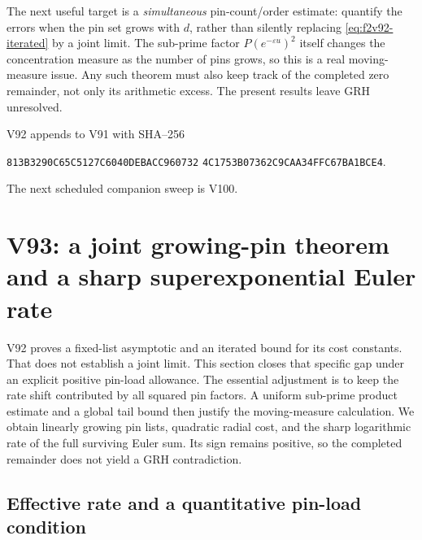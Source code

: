 \documentclass[11pt]{article}
\theoremstyle{definition}
\theoremstyle{remark}
\begin{document}
The next useful target is a \emph{simultaneous} pin-count/order estimate:
quantify the errors when the pin set grows with \(d\), rather than
silently replacing \eqref{eq:f2v92-iterated} by a joint limit.
The sub-prime factor \(P(e^{-\varepsilon u})^2\) itself changes
the concentration measure as the number of pins grows, so this is a
real moving-measure issue.  Any such theorem must also keep track of
the completed zero remainder, not only its arithmetic excess.  The
present results leave GRH unresolved.

V92 appends to V91 with SHA--256
\begin{center}
\texttt{813B3290C65C5127C6040DEBACC960732}\allowbreak
\texttt{4C1753B07362C9CAA34FFC67BA1BCE4}.
\end{center}
The next scheduled companion sweep is V100.
\endgroup

\clearpage
\section{V93: a joint growing-pin theorem and a sharp superexponential Euler rate}
\label{sec:f2v93-joint-pins}
\begingroup
\setcounter{equation}{0}
\renewcommand{\theequation}{N93.\arabic{equation}}
\renewcommand{\theHequation}{f2v93.\arabic{equation}}

V92 proves a fixed-list asymptotic and an iterated bound for its cost
constants.  That does not establish a joint limit.  This section closes
that specific gap under an explicit positive pin-load allowance.  The
essential adjustment is to keep the rate shift contributed by all
squared pin factors.  A uniform sub-prime product estimate and a global
tail bound then justify the moving-measure calculation.  We obtain
linearly growing pin lists, quadratic radial cost, and the sharp
logarithmic rate of the full surviving Euler sum.  Its sign remains
positive, so the completed remainder does not yield a GRH contradiction.

\subsection{Effective rate and a quantitative pin-load condition}
\end{document}
